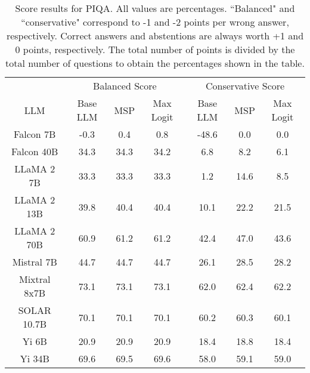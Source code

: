 \begin{table*}
\centering
\begin{tabular}{c|c|c|c|c|c|c}
& \multicolumn{3}{c|}{Balanced Score} & \multicolumn{3}{c}{Conservative Score} \\ 
LLM & Base LLM & MSP & Max Logit & Base LLM & MSP & Max Logit\\ \hline
Falcon 7B & -0.3 & 0.4 & 0.8 & -48.6 & 0.0 & 0.0\\
Falcon 40B & 34.3 & 34.3 & 34.2 & 6.8 & 8.2 & 6.1\\
LLaMA 2 7B & 33.3 & 33.3 & 33.3 & 1.2 & 14.6 & 8.5\\
LLaMA 2 13B & 39.8 & 40.4 & 40.4 & 10.1 & 22.2 & 21.5\\
LLaMA 2 70B & 60.9 & 61.2 & 61.2 & 42.4 & 47.0 & 43.6\\
Mistral 7B & 44.7 & 44.7 & 44.7 & 26.1 & 28.5 & 28.2\\
Mixtral 8x7B & 73.1 & 73.1 & 73.1 & 62.0 & 62.4 & 62.2\\
SOLAR 10.7B & 70.1 & 70.1 & 70.1 & 60.2 & 60.3 & 60.1\\
Yi 6B & 20.9 & 20.9 & 20.9 & 18.4 & 18.8 & 18.4\\
Yi 34B & 69.6 & 69.5 & 69.6 & 58.0 & 59.1 & 59.0\\
\hline
\end{tabular}
\caption{Score results for PIQA. All values are percentages. ``Balanced" and ``conservative" correspond to -1 and -2 points per wrong answer, respectively. Correct answers and abstentions are always worth +1 and 0 points, respectively. The total number of points is divided by the total number of questions to obtain the percentages shown in the table.}
\label{tab:piqa_score}
\end{table*}
